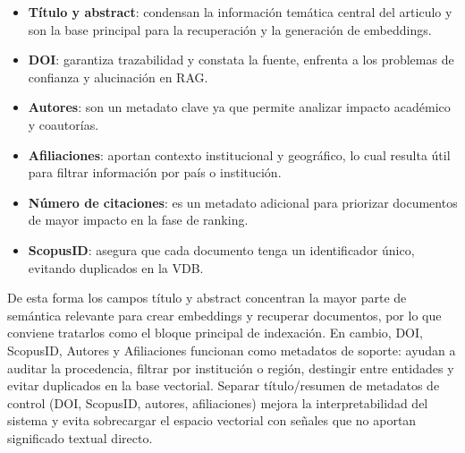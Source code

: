 \begin{itemize}
    \item \textbf{Título y abstract}: condensan la información temática central del articulo y son la base principal para la recuperación y la generación de embeddings.
    \item \textbf{DOI}: garantiza trazabilidad y constata la fuente, enfrenta a los problemas de confianza y alucinación en RAG.
    \item \textbf{Autores}: son un metadato clave ya que permite analizar impacto académico y coautorías. 
    \item \textbf{Afiliaciones}: aportan contexto institucional y geográfico, lo cual resulta útil para filtrar información por país o institución.
    \item \textbf{Número de citaciones}: es un metadato adicional para priorizar documentos de mayor impacto en la fase de ranking.
    \item \textbf{ScopusID}: asegura que cada documento tenga un identificador único, evitando duplicados en la VDB. 
\end{itemize}

De esta forma los campos título y abstract concentran la mayor parte de semántica relevante para crear embeddings y recuperar documentos, por lo que conviene tratarlos como el bloque principal de indexación.
En cambio, DOI, ScopusID, Autores y Afiliaciones funcionan como metadatos de soporte: ayudan a auditar la procedencia, filtrar por institución o región, destingir entre entidades y evitar duplicados en la base 
vectorial. Separar título/resumen de metadatos de control (DOI, ScopusID, autores, afiliaciones)  mejora la interpretabilidad del sistema y evita sobrecargar el espacio vectorial 
con señales que no aportan significado textual directo.

